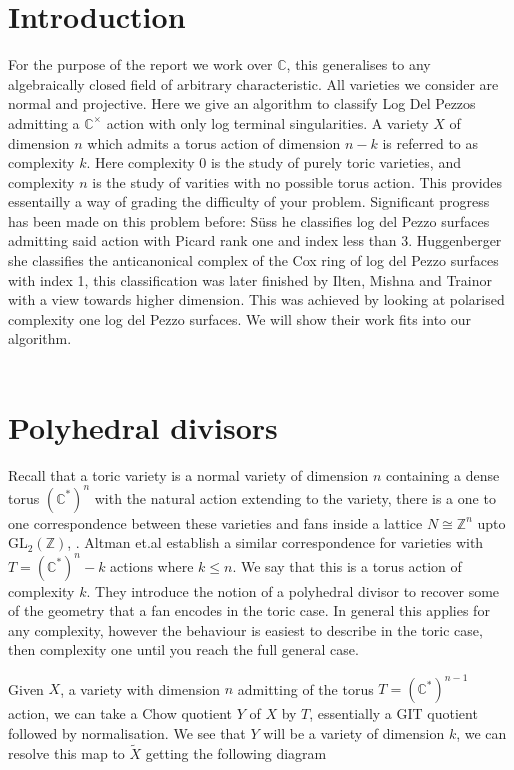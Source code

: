 \documentclass[11pt]{amsart}
\theoremstyle{plain}
\newcommand{\C}[1]{(\mathbb{C}^*)^#1}
\begin{document}
 


\section{Introduction}

For the purpose of the report we work over $\mathbb{C}$, this generalises to any algebraically closed field of arbitrary characteristic. All varieties we consider are normal and projective. Here we give an algorithm to classify Log Del Pezzos admitting a $\mathbb{C}^\times$ action with only log terminal singularities. A variety $X$ of dimension $n$ which admits a torus action of dimension $n-k$ is referred to as complexity $k$. Here complexity 0 is the study of purely toric varieties, and complexity $n$ is the study of varities with no possible torus action. This provides essentailly a way of grading the difficulty of your problem. Significant progress has been made on this problem before: S\"{u}ss \cite{Suss} he classifies log del Pezzo surfaces admitting said action with Picard rank one and index less than 3. Huggenberger \cite{Huggenberger} she classifies the anticanonical complex of the Cox ring of log del Pezzo surfaces with index 1, this classification was later finished by Ilten, Mishna and Trainor \cite{IMT} with a view towards higher dimension. This was achieved by looking at polarised complexity one log del Pezzo surfaces. We will show their work fits into our algorithm. 
\\
\\
\section{Polyhedral divisors}
Recall that a toric variety is a  normal variety of dimension $n$ containing a dense torus $\C{n}$ with the natural action extending to the variety, there is a one to one correspondence between these varieties and fans inside a lattice $N \cong \mathbb{Z}^n$ upto GL$_2(\mathbb{Z})$, \cite{Cox}.
Altman et.al \cite{Altmann} establish a similar correspondence for varieties with $T = \C{n-k}$ actions where $k \leq n$. We say that this is a torus action of complexity $k$. They introduce the notion of a polyhedral divisor to recover some of the geometry that a fan encodes in the toric case. In general this applies for any complexity, however the behaviour is easiest to describe in the toric case, then complexity one until you reach the full general case.


Given $X$, a variety with dimension $n$ admitting of the torus $ T = (\mathbb{C}^*)^{n-1}$ action, we can take a Chow quotient $Y$ of $X$ by $T$, essentially a GIT quotient followed by normalisation.  We see that $Y$ will be a variety of dimension $k$, we can resolve this map to $\tilde{X}$ getting the following diagram
\end{document}
